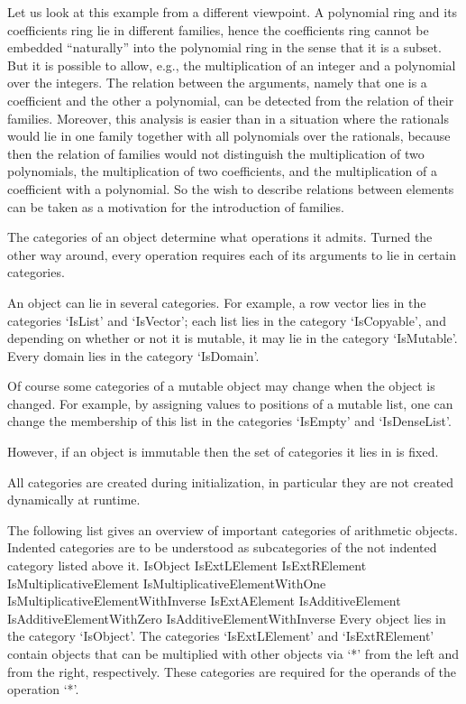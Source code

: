 Let us look at this example from a different viewpoint.
A polynomial ring and its coefficients ring lie in different families,
hence the coefficients ring cannot be embedded ``naturally'' into the
polynomial ring in the sense that it is a subset.
But it is possible to allow, e.g., the multiplication of an integer
and a polynomial over the integers.
The relation between the arguments,
namely that one is a coefficient and the other a polynomial,
can be detected from the relation of their families.
Moreover, this analysis is easier than in a situation where the rationals
would lie in one family together with all polynomials over the rationals,
because then the relation of families would not distinguish
the multiplication of two polynomials,
the multiplication of two coefficients,
and the multiplication of a coefficient with a polynomial.
So the wish to describe relations between elements
can be taken as a motivation for the introduction of families.


The categories of an object determine what operations it admits.
Turned the other way around, every operation requires each of its
arguments to lie in certain categories.

An object can lie in several categories.
For example, a row vector lies in the categories `IsList' and `IsVector';
each list lies in the category `IsCopyable',
and depending on whether or not it is mutable, it may lie in the category
`IsMutable'.
Every domain lies in the category `IsDomain'.

Of course some categories of a mutable object may change when the object
is changed.
For example, by assigning values to positions of a mutable list,
one can change the membership of this list in the categories `IsEmpty'
and `IsDenseList'.

However, if an object is immutable then the set of categories it lies in
is fixed.

All categories are created during initialization,
in particular they are not created dynamically at runtime.

The following list gives an overview of important categories of
arithmetic objects.
Indented categories are to be understood as subcategories of the not
indented category listed above it.
\begintt
    IsObject
        IsExtLElement
        IsExtRElement
            IsMultiplicativeElement
                IsMultiplicativeElementWithOne
                    IsMultiplicativeElementWithInverse
        IsExtAElement
            IsAdditiveElement
                IsAdditiveElementWithZero
                    IsAdditiveElementWithInverse
\endtt
Every object lies in the category `IsObject'.
The categories `IsExtLElement' and `IsExtRElement' contain objects
that can be multiplied with other objects via `*' from the left and
from the right, respectively.
These categories are required for the operands of the operation `*'.

